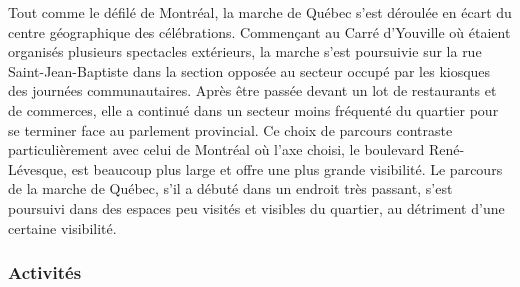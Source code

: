Tout comme le défilé de Montréal, la marche de Québec s'est déroulée en écart du centre géographique des célébrations.
Commençant au Carré d'Youville où étaient organisés plusieurs spectacles extérieurs, la marche s'est poursuivie sur la rue Saint-Jean-Baptiste dans la section opposée au secteur occupé par les kiosques des journées communautaires.
Après être passée devant un lot de restaurants et de commerces, elle a continué dans un secteur moins fréquenté du quartier pour se terminer face au parlement provincial.
Ce choix de parcours contraste particulièrement avec celui de Montréal où l'axe choisi, le boulevard René-Lévesque, est beaucoup plus large et offre une plus grande visibilité.
Le parcours de la marche de Québec, s'il a débuté dans un endroit très passant, s'est poursuivi dans des espaces peu visités et visibles du quartier, au détriment d'une certaine visibilité.

\subsubsection{Activités}
\label{subsec:activitesfiertemontreal}




